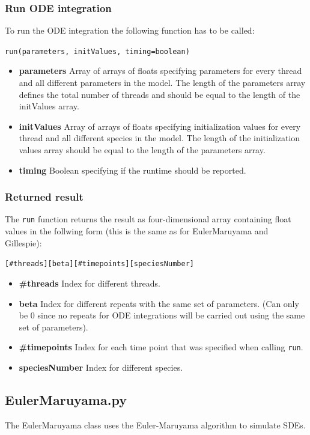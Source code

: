 \documentclass [11pt, a4paper, openany, twoside=off] {article}
\begin{document}
\subsubsection{Run ODE integration}
To run the ODE integration the following function has to be called:
\begin{center}
\texttt{run(parameters, initValues, timing=boolean)}
\end{center}
\begin{itemize}
	\item \textbf{parameters} Array of arrays of floats specifying parameters for every thread and all different parameters in the model. The length of the parameters array defines the total number of threads and should be equal to the length of the initValues array.
	\item \textbf{initValues}  Array of arrays of floats specifying initialization values for every thread and all different species in the model. The length of the initialization values array should be equal to the length of the parameters array.
\item \textbf{timing} Boolean specifying if the runtime should be reported.
\end{itemize}

\subsubsection{Returned result}
The \verb$run$ function returns the result as four-dimensional array containing float values in the follwing form (this is the same as for EulerMaruyama and Gillespie):
\begin{center}
\texttt{[\#threads][beta][\#timepoints][speciesNumber]}
\end{center}
\begin{itemize}
	\item \textbf{\#threads} Index for different threads.
	\item \textbf{beta} Index for different repeats with the same set of parameters. (Can only be 0 since no repeats for ODE integrations will be carried out using the same set of parameters).
	\item \textbf{\#timepoints} Index for each time point that was specified when calling \verb$run$.
	\item \textbf{speciesNumber} Index for different species.
\end{itemize}


\subsection{EulerMaruyama.py}
The EulerMaruyama class uses the Euler-Maruyama algorithm to simulate SDEs. 
\end{document}
